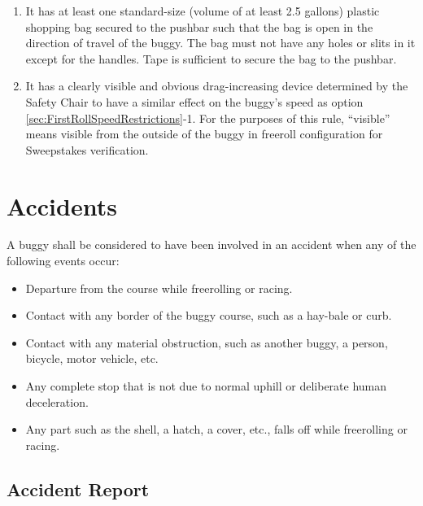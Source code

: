 	\begin{enumerate}
		\item It has at least one standard-size (volume of at least 2.5 gallons) plastic shopping bag secured to the pushbar such that the bag is open in the direction of travel of the buggy. The bag must not have any holes or slits in it except for the handles. Tape is sufficient to secure the bag to the pushbar.

		\item It has a clearly visible and obvious drag-increasing device determined by the Safety Chair to have a similar effect on the buggy's speed as option
		\ref{sec:FirstRollSpeedRestrictions}-1. For the purposes of this rule, “visible” means visible from the outside of the buggy in freeroll configuration for Sweepstakes verification. 
	\end{enumerate}

\section{Accidents}
\label{sec:Accidents}

	\noindent A buggy shall be considered to have been involved in an accident when any of the following events occur:

	\begin{itemize}
		\item Departure from the course while freerolling or racing.
		\item Contact with any border of the buggy course, such as a hay-bale or curb.
		\item Contact with any material obstruction, such as another buggy, a person, bicycle, motor vehicle, etc.
		\item Any complete stop that is not due to normal uphill or deliberate human deceleration.
		\item Any part such as the shell, a hatch, a cover, etc., falls off while freerolling or racing.
	\end{itemize}


\subsection{Accident Report}

